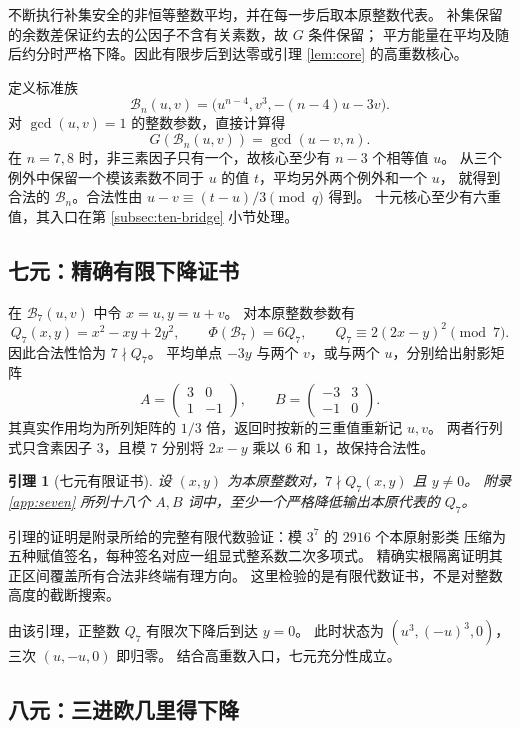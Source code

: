 \documentclass[UTF8,fontset=fandol,zihao=-4,a4paper]{ctexart}
\numberwithin{equation}{section}
\newtheorem{lemma}[theorem]{引理}
\theoremstyle{definition}
\newcommand{\B}{\mathcal B}
\newcommand{\mat}[4]{\begin{pmatrix}#1&#2\\#3&#4\end{pmatrix}}
\begin{document}
不断执行补集安全的非恒等整数平均，并在每一步后取本原整数代表。
补集保留的余数差保证约去的公因子不含有关素数，故 $G$ 条件保留；
平方能量在平均及随后约分时严格下降。因此有限步后到达零或引理 \ref{lem:core} 的高重数核心。

定义标准族
\begin{equation}\label{eq:B}
 \B_n(u,v)=\bigl(u^{n-4},v^3,-(n-4)u-3v\bigr).
\end{equation}
对 $\gcd(u,v)=1$ 的整数参数，直接计算得
\begin{equation}\label{eq:B-G}
 G(\B_n(u,v))=\gcd(u-v,n).
\end{equation}
在 $n=7,8$ 时，非三素因子只有一个，故核心至少有 $n-3$ 个相等值 $u$。
从三个例外中保留一个模该素数不同于 $u$ 的值 $t$，平均另外两个例外和一个 $u$，
就得到合法的 $\B_n$。合法性由
$u-v\equiv(t-u)/3\pmod q$ 得到。
十元核心至少有六重值，其入口在第 \ref{subsec:ten-bridge} 小节处理。

\subsection{七元：精确有限下降证书}\label{subsec:seven}

在 $\B_7(u,v)$ 中令 $x=u,y=u+v$。
对本原整数参数有
\[
 Q_7(x,y)=x^2-xy+2y^2,\qquad
 \Phi(\B_7)=6Q_7,\qquad
 Q_7\equiv2(2x-y)^2\pmod7.
\]
因此合法性恰为 $7\nmid Q_7$。
平均单点 $-3y$ 与两个 $v$，或与两个 $u$，分别给出射影矩阵
\begin{equation}\label{eq:seven-generators}
 A=\mat{3}{0}{1}{-1},\qquad B=\mat{-3}{3}{-1}{0}.
\end{equation}
其真实作用均为所列矩阵的 $1/3$ 倍，返回时按新的三重值重新记 $u,v$。
两者行列式只含素因子 $3$，且模 $7$ 分别将 $2x-y$ 乘以 $6$ 和 $1$，故保持合法性。

\begin{lemma}[七元有限证书]\label{lem:seven-certificate}
设 $(x,y)$ 为本原整数对，$7\nmid Q_7(x,y)$ 且 $y\ne0$。
附录 \ref{app:seven} 所列十八个 $A,B$ 词中，至少一个严格降低输出本原代表的 $Q_7$。
\end{lemma}

引理的证明是附录所给的完整有限代数验证：模 $3^7$ 的 $2916$ 个本原射影类
压缩为五种赋值签名，每种签名对应一组显式整系数二次多项式。
精确实根隔离证明其正区间覆盖所有合法非终端有理方向。
这里检验的是有限代数证书，不是对整数高度的截断搜索。

由该引理，正整数 $Q_7$ 有限次下降后到达 $y=0$。
此时状态为 $(u^3,(-u)^3,0)$，三次 $(u,-u,0)$ 即归零。
结合高重数入口，七元充分性成立。

\subsection{八元：三进欧几里得下降}\label{subsec:eight}
\end{document}
